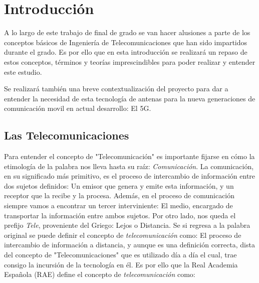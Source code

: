 
\chapter{Introducción}

\par A lo largo de este trabajo de final de grado se van hacer alusiones a parte de los conceptos básicos de Ingeniería de Telecomunicaciones que han sido impartidos durante el grado. Es por ello que en esta introducción se realizará un repaso de estos conceptos, términos y teorías imprescindibles para poder realizar y entender este estudio.
\\
\par Se realizará también una breve contextualización del proyecto para dar a entender la necesidad de esta tecnología de antenas para la nueva generaciones de comunicación movil en actual desarrollo: El 5G. 

\section{Las Telecomunicaciones}

\par Para entender el concepto de "Telecomunicación" es importante fijarse en cómo la etimología de la palabra nos lleva hasta su raíz: \textit{Comunicación}. La comunicación, en su significado más primitivo, es el proceso de intercambio de información entre dos sujetos definidos: Un emisor que genera y emite esta información, y un receptor que la recibe y la procesa. Además, en el proceso de comunicación siempre vamos a encontrar un tercer interviniente: El medio, encargado de transportar la información entre ambos sujetos. Por otro lado, nos queda el prefijo \textit{Tele}, proveniente del Griego: Lejos o Distancia. Se si regresa a la palabra original se puede definir el concepto de \textit{telecomunicación} como: El proceso de intercambio de información a distancia, y aunque es una definición correcta, dista del concepto de "Telecomunicaciones" que es utilizado día a día el cual, trae consigo la incursión de la tecnología en él. Es por ello que la Real Academia Española (RAE) define el concepto de \textit{telecomunicación} como:

